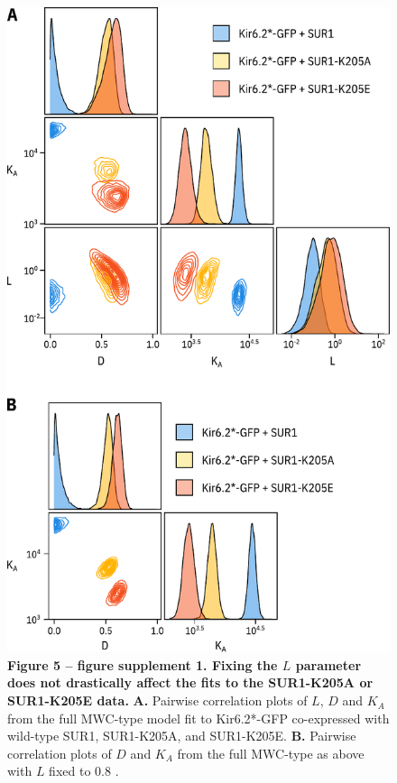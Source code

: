 \documentclass[9pt,lineno, onehalfspacing]{elife_modified}
\begin{document}
\begin{figure}
\begin{fullwidth}
\includegraphics[height=0.95\textheight]{figure_five_s1}
\captionsetup{labelformat=empty}
\caption{
\textbf{Figure 5 -- figure supplement 1. Fixing the $L$ parameter does not drastically affect the fits to the SUR1-K205A or SUR1-K205E data.}
\textbf{A.}
Pairwise correlation plots of $L$, $D$ and $K_A$ from the full MWC-type model fit to Kir6.2*-GFP co-expressed with wild-type SUR1, SUR1-K205A, and SUR1-K205E.
\textbf{B.}
Pairwise correlation plots of $D$ and $K_A$ from the full MWC-type as above with $L$ fixed to 0.8 \citep{RN92}.
}
\label{fig:five_s1}
\end{fullwidth}
\end{figure}
\end{document}
